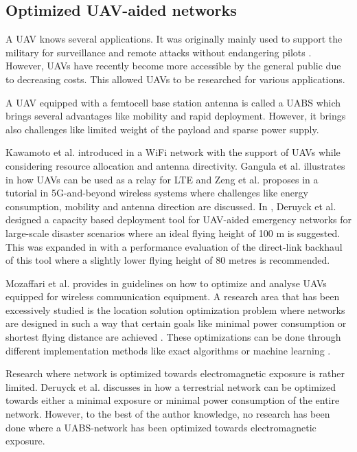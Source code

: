 \documentclass[twocolumn]{phdsymp} %
\begin{document}
\subsection{Optimized \gls{UAV}-aided networks}

A \gls{UAV} knows several applications. It was originally mainly used to support the military for surveillance and remote attacks without 
endangering pilots \cite{U12}. However, \gls{UAV}s have recently become more accessible by the general public due to decreasing costs. This 
allowed \gls{UAV}s to be researched for various applications.

A \gls{UAV} equipped with a femtocell base station antenna is called a \gls{UABS}
which brings several advantages like mobility and rapid deployment. 
However, it brings also challenges like limited weight of the payload and sparse power supply.

Kawamoto et al. introduced in \cite{U11} a WiFi network with the support of  \gls{UAV}s while considering resource allocation 
and antenna directivity. 
Gangula et al. illustrates in \cite{U10} how \gls{UAV}s can be used as a relay for \gls{LTE}
and
Zeng et al. proposes in  \cite{U12} a tutorial in 5G-and-beyond wireless systems where challenges like 
energy consumption, mobility and antenna direction are discussed. 
In \cite{J2}, Deruyck et al. designed  a capacity based deployment tool for UAV-aided emergency
networks for large-scale disaster scenarios where an ideal flying height of 100 m is suggested. This was expanded 
in \cite{U1} with a performance evaluation of the direct-link backhaul of this tool where a slightly lower 
flying height of 80 metres is recommended.


Mozaffari et al. provides in \cite{U3} guidelines on how to optimize and analyse \gls{UAV}s equipped for 
wireless communication equipment.
A research area that has been excessively studied is the location solution optimization problem where networks are 
designed in such a way that certain goals like minimal power consumption or shortest flying distance are achieved \cite{U6,U7,U8,U9}.
These optimizations can be done through different implementation methods like exact algorithms or machine learning \cite{U3,U5}.

Research where network is optimized towards electromagnetic exposure is rather limited.
Deruyck et al. discusses in \cite{J1} how a terrestrial network can be optimized towards either a minimal exposure or minimal power consumption of the entire network.
However, to the best of the author knowledge, no research has been done where a \gls{UABS}-network has been optimized towards electromagnetic exposure.
\end{document}
